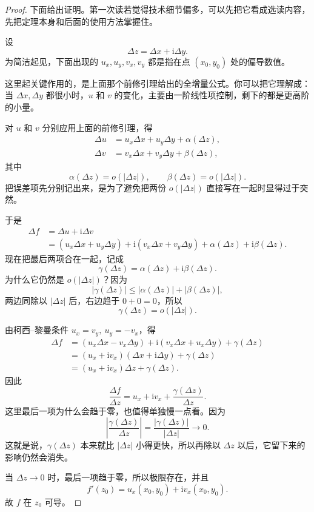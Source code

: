 \begin{proof}
下面给出证明。第一次读若觉得技术细节偏多，可以先把它看成选读内容，先把定理本身和后面的使用方法掌握住。

设
\[
    \Delta z=\Delta x+\mathrm{i}\Delta y.
\]
为简洁起见，下面出现的 $u_x,u_y,v_x,v_y$ 都是指在点 $(x_0,y_0)$ 处的偏导数值。

这里起关键作用的，是上面那个前修引理给出的全增量公式。你可以把它理解成：当 $\Delta x,\Delta y$ 都很小时，$u$ 和 $v$ 的变化，主要由一阶线性项控制，剩下的都是更高阶的小量。

对 $u$ 和 $v$ 分别应用上面的前修引理，得
\begin{align*}
    \Delta u&=u_x\Delta x+u_y\Delta y+\alpha(\Delta z),\\
    \Delta v&=v_x\Delta x+v_y\Delta y+\beta(\Delta z),
\end{align*}
其中
\[
    \alpha(\Delta z)=o(|\Delta z|),\qquad \beta(\Delta z)=o(|\Delta z|).
\]
把误差项先分别记出来，是为了避免把两份 $o(|\Delta z|)$ 直接写在一起时显得过于突然。

于是
\begin{align*}
    \Delta f
    &=\Delta u+\mathrm{i}\Delta v\\
    &=(u_x\Delta x+u_y\Delta y)+\mathrm{i}(v_x\Delta x+v_y\Delta y)
      +\alpha(\Delta z)+\mathrm{i}\beta(\Delta z).
\end{align*}
现在把最后两项合在一起，记成
\[
    \gamma(\Delta z)=\alpha(\Delta z)+\mathrm{i}\beta(\Delta z).
\]
为什么它仍然是 $o(|\Delta z|)$？因为
\[
    |\gamma(\Delta z)|
    \le |\alpha(\Delta z)|+|\beta(\Delta z)|,
\]
两边同除以 $|\Delta z|$ 后，右边趋于 $0+0=0$，所以
\[
    \gamma(\Delta z)=o(|\Delta z|).
\]

由柯西--黎曼条件 $u_x=v_y,\ u_y=-v_x$，得
\begin{align*}
    \Delta f
    &=(u_x\Delta x-v_x\Delta y)+\mathrm{i}(v_x\Delta x+u_x\Delta y)+\gamma(\Delta z)\\
    &=(u_x+\mathrm{i}v_x)(\Delta x+\mathrm{i}\Delta y)+\gamma(\Delta z)\\
    &=(u_x+\mathrm{i}v_x)\Delta z+\gamma(\Delta z).
\end{align*}
因此
\[
    \frac{\Delta f}{\Delta z}=u_x+\mathrm{i}v_x+\frac{\gamma(\Delta z)}{\Delta z}.
\]
这里最后一项为什么会趋于零，也值得单独慢一点看。因为
\[
    \left|\frac{\gamma(\Delta z)}{\Delta z}\right|
    =\frac{|\gamma(\Delta z)|}{|\Delta z|}\to 0.
\]
这就是说，$\gamma(\Delta z)$ 本来就比 $|\Delta z|$ 小得更快，所以再除以 $\Delta z$ 以后，它留下来的影响仍然会消失。

当 $\Delta z\to 0$ 时，最后一项趋于零，所以极限存在，并且
\[
    f'(z_0)=u_x(x_0,y_0)+\mathrm{i}v_x(x_0,y_0).
\]
故 $f$ 在 $z_0$ 可导。
\end{proof}

